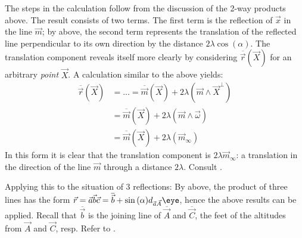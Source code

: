 \documentclass{birkjour}
\newcommand{\mydogblue}{{\color{gray} $\square$~~}}
\begin{document}
{\begin{figure}
\label{fig:glideref}
\end{figure}
The steps in the calculation follow from the discussion of the 2-way products above.
The result consists of two terms. The first term is the reflection of $\vec{x}$ in the line $\vec{m}$; by  above, the second term represents the translation of the reflected line perpendicular to its own direction by the distance $2\lambda \cos(\alpha)$.   %
The translation component reveals itself more clearly by considering $\overline{\vec{r}}(\vec{X})$ for an arbitrary \emph{point} $\vec{X}$.  A calculation similar to the above yields:
\begin{align*}
\overline{\vec{r}}(\vec{X}) &= ... = \overline{ \vec{m}}(\vec{X}) + 2 \lambda(\vec{m} \wedge \vec{X}^{\perp}) \\
&=  \overline{ \vec{m}}(\vec{X})  + 2 \lambda (\vec{m} \wedge \vec{\omega}) \\
&=  \overline{ \vec{m}}(\vec{X})  + 2 \lambda (\vec{m}_{\infty}) 
\end{align*}
In this form it is clear that the translation component is $2\lambda \vec{m}_{\infty}$: a translation in  the direction  of the line $\vec{m}$ through a distance $2\lambda$.  Consult .

Applying this to the situation of 3 reflections:  By  above, the product of three lines has the form $\vec{r} = \vec{a}\vec{b}\vec{c} = \overline{\vec{b}} + \sin{(\alpha)}d_{\vec{a}\vec{A}}\eye$, hence the above results can be applied. Recall that $\overline{\vec{b}}$ is the joining line of $\overline{\vec{A}}$ and $\overline{\vec{C}}$, the feet of the altitudes from $\vec{A}$ and $\vec{C}$, resp. Refer to .  %
%

}
\end{document}
